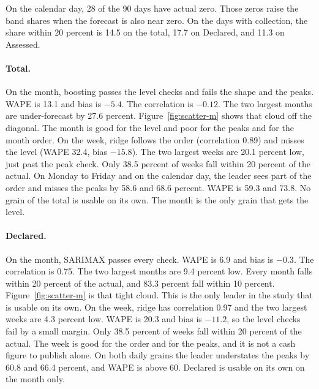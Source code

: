 \begin{table}[ht]
  \caption{Absolute accuracy of the sMAPE leader.
  WAPE, bias, peak, and the two bands are percents.
  Bias and peak are negative when the forecast is low.
  A leader is usable on its own only when WAPE is at most 20, the absolute bias is at most 10, the correlation is at least 0.50, the peak under-forecast is at most 20, and at least half of the periods fall within 20 percent of the actual.}
  \label{tab:absolute}
  \centering
  \scriptsize
  
\end{table}

On the calendar day, 28 of the 90 days have actual zero.
Those zeros raise the band shares when the forecast is also near zero.
On the days with collection, the share within 20 percent is 14.5 on the total, 17.7 on Declared, and 11.3 on Assessed.

\paragraph{Total.}
On the month, boosting passes the level checks and fails the shape and the peaks.
WAPE is 13.1 and bias is $-5.4$.
The correlation is $-0.12$.
The two largest months are under-forecast by 27.6 percent.
Figure~\ref{fig:scatter-m} shows that cloud off the diagonal.
The month is good for the level and poor for the peaks and for the month order.
On the week, ridge follows the order (correlation 0.89) and misses the level (WAPE 32.4, bias $-15.8$).
The two largest weeks are 20.1 percent low, just past the peak check.
Only 38.5 percent of weeks fall within 20 percent of the actual.
On Monday to Friday and on the calendar day, the leader sees part of the order and misses the peaks by 58.6 and 68.6 percent.
WAPE is 59.3 and 73.8.
No grain of the total is usable on its own.
The month is the only grain that gets the level.

\paragraph{Declared.}
On the month, SARIMAX passes every check.
WAPE is 6.9 and bias is $-0.3$.
The correlation is 0.75.
The two largest months are 9.4 percent low.
Every month falls within 20 percent of the actual, and 83.3 percent fall within 10 percent.
Figure~\ref{fig:scatter-m} is that tight cloud.
This is the only leader in the study that is usable on its own.
On the week, ridge has correlation 0.97 and the two largest weeks are 4.3 percent low.
WAPE is 20.3 and bias is $-11.2$, so the level checks fail by a small margin.
Only 38.5 percent of weeks fall within 20 percent of the actual.
The week is good for the order and for the peaks, and it is not a cash figure to publish alone.
On both daily grains the leader understates the peaks by 60.8 and 66.4 percent, and WAPE is above 60.
Declared is usable on its own on the month only.

